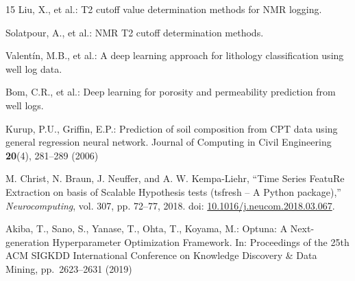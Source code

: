 \documentclass[runningheads]{llncs}
\begin{document}
\begin{thebibliography}{15}
Liu, X., et al.:
T2 cutoff value determination methods for NMR logging.

Solatpour, A., et al.:
NMR T2 cutoff determination methods.


Valent\'{i}n, M.B., et al.:
A deep learning approach for lithology classification using well log data.

Bom, C.R., et al.:
Deep learning for porosity and permeability prediction from well logs.

Kurup, P.U., Griffin, E.P.:
Prediction of soil composition from CPT data using general regression neural network.
Journal of Computing in Civil Engineering \textbf{20}(4), 281--289 (2006)






M. Christ, N. Braun, J. Neuffer, and A. W. Kempa-Liehr,
``Time Series FeatuRe Extraction on basis of Scalable Hypothesis tests (tsfresh – A Python package),''
\textit{Neurocomputing}, vol. 307, pp. 72--77, 2018.
doi: \href{https://doi.org/10.1016/j.neucom.2018.03.067}{10.1016/j.neucom.2018.03.067}.

Akiba, T., Sano, S., Yanase, T., Ohta, T., Koyama, M.:
Optuna: A Next-generation Hyperparameter Optimization Framework.
In: Proceedings of the 25th ACM SIGKDD International Conference on Knowledge Discovery
\& Data Mining, pp.~2623--2631 (2019)


\end{thebibliography}
\end{document}
